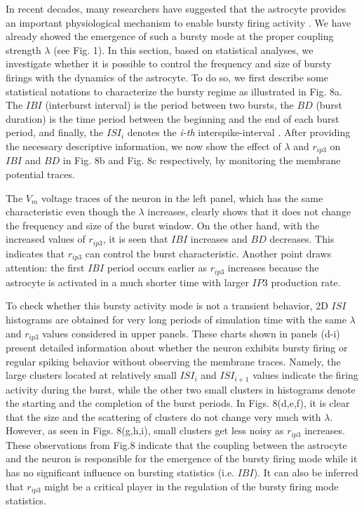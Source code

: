 \documentclass[%
 aip,
 amsmath,amssymb,
 reprint,%
]{revtex4-1}
\begin{document}
In recent decades, many researchers have suggested that the astrocyte  provides an important physiological mechanism to enable bursty firing activity \cite{ Morquette2015, Deemyad2018}. We have already showed the emergence of such a bursty mode at the proper coupling strength $\lambda$ (see Fig. 1). In this section, based on statistical analyses, we investigate whether it is possible to control the frequency and size of bursty firings with the dynamics of the astrocyte. To do so, we first describe some statistical notations to characterize the bursty regime as illustrated in Fig. 8a. The $IBI$ (interburst interval) is the period between two bursts, the $BD$ (burst duration) is the time period between the beginning and the end of each burst period, and finally, the $ISI_{i}$ denotes the \textit{i-th} interspike-interval \cite{womack2004, fardet2018}. After providing the necessary descriptive information, we now show the effect of $\lambda$ and $r_{ip3}$ on $IBI$ and $BD$ in Fig. 8b and Fig. 8c respectively, by monitoring the membrane potential traces. 

The $V_{m}$ voltage traces of the neuron in the left panel, which has the same characteristic even though the $\lambda$ increases, clearly shows that it does not change the frequency and size of the burst window. On the other hand, with the increased values of $r_{ip3}$, it is seen that $IBI$ increases and $BD$ decreases. This indicates that $r_{ip3}$ can control the burst characteristic. Another point draws attention: the first $IBI$ period occurs earlier as $r_{ip3}$ increases because the astrocyte is activated in a much shorter time with larger $IP3$ production rate. 

To check whether this bursty activity mode is not a transient behavior, 2D $ISI$ histograms are obtained for very long periods of simulation time with the same $\lambda$ and $r_{ip3}$ values considered in upper panels. These charts shown in panels (d-i) present detailed information about whether the neuron exhibits bursty firing or regular spiking behavior without observing the membrane traces. Namely, the large clusters located at relatively small $ISI_{i}$ and $ISI_{i+1}$ values indicate the firing activity during the burst, while the other two small clusters in histograms denote the starting and the completion of the burst periods. In Figs. 8(d,e,f), it is clear that the size and the scattering of clusters do not change very much with $\lambda$. However, as seen in Figs. 8(g,h,i), small clusters get less noisy as $r_{ip3}$ increases. These observations from Fig.8 indicate that the coupling between the astrocyte and the neuron is responsible for the emergence of the bursty firing mode while it has no significant influence on bursting statistics (i.e. $IBI$). It can also be inferred that $r_{ip3}$ might be a critical player in the regulation of the bursty firing mode statistics.
\end{document}
